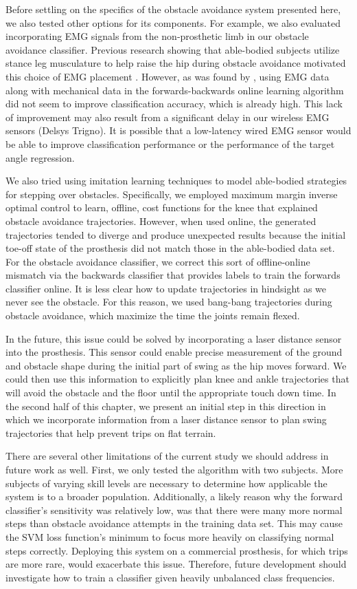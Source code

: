 Before settling on the specifics of the obstacle avoidance system presented
here, we also tested other options for its components. For example, we also
evaluated incorporating EMG signals from the non-prosthetic limb in our obstacle
avoidance classifier. Previous research showing that able-bodied subjects
utilize stance leg musculature to help raise the hip during obstacle avoidance
motivated this choice of EMG placement \citep{patla1995role}. However, as was
found by \citet{spanias2018online}, using EMG data along with mechanical data in
the forwards-backwards online learning algorithm did not seem to improve
classification accuracy, which is already high. This lack of improvement may
also result from a significant delay in our wireless EMG sensors (Delsys
Trigno). It is possible that a low-latency wired EMG sensor would be able to
improve classification performance or the performance of the target angle
regression.

We also tried using imitation learning techniques to model able-bodied
strategies for stepping over obstacles. Specifically, we employed maximum margin
inverse optimal control \citep{ratliff2007online} to learn, offline, cost
functions for the knee that explained obstacle avoidance trajectories. However,
when used online, the generated trajectories tended to diverge and produce
unexpected results because the initial toe-off state of the prosthesis did not
match those in the able-bodied data set. For the obstacle avoidance classifier,
we correct this sort of offline-online mismatch via the backwards classifier
that provides labels to train the forwards classifier online. It is less clear
how to update trajectories in hindsight as we never see the obstacle. For this
reason, we used bang-bang trajectories during obstacle avoidance, which maximize
the time the joints remain flexed.

In the future, this issue could be solved by incorporating a laser distance
sensor into the prosthesis. This sensor could enable precise measurement of the
ground and obstacle shape during the initial part of swing as the hip moves
forward. We could then use this information to explicitly plan knee and ankle
trajectories that will avoid the obstacle and the floor until the appropriate
touch down time. In the second half of this chapter, we present an initial step
in this direction in which we incorporate information from a laser distance
sensor to plan swing trajectories that help prevent trips on flat terrain.

There are several other limitations of the current study we should address in
future work as well. First, we only tested the algorithm with two subjects. More
subjects of varying skill levels are necessary to determine how applicable the
system is to a broader population. Additionally, a likely reason why the forward
classifier's sensitivity was relatively low, was that there were many more
normal steps than obstacle avoidance attempts in the training data set. This may
cause the SVM loss function's minimum to focus more heavily on classifying
normal steps correctly. Deploying this system on a commercial prosthesis, for
which trips are more rare, would exacerbate this issue. Therefore, future
development should investigate how to train a classifier given heavily
unbalanced class frequencies.
